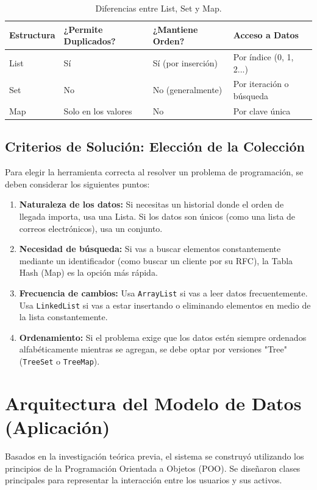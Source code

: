 \documentclass[12pt, letterpaper]{article}
\begin{document}
	\begin{table}[h]
		\centering
		\begin{tabular}{@{}llll@{}}
			\toprule
			\textbf{Estructura} & \textbf{¿Permite Duplicados?} & \textbf{¿Mantiene Orden?} & \textbf{Acceso a Datos} \\ \midrule
			List & Sí & Sí (por inserción) & Por índice (0, 1, 2...) \\
			Set & No & No (generalmente) & Por iteración o búsqueda \\
			Map & Solo en los valores & No & Por clave única \\ \bottomrule
		\end{tabular}
		\caption{Diferencias entre List, Set y Map.}
	\end{table}
	
	\subsection{Criterios de Solución: Elección de la Colección}
	Para elegir la herramienta correcta al resolver un problema de programación, se deben considerar los siguientes puntos:
	\begin{enumerate}
		\item \textbf{Naturaleza de los datos:} Si necesitas un historial donde el orden de llegada importa, usa una Lista. Si los datos son únicos (como una lista de correos electrónicos), usa un conjunto.
		\item \textbf{Necesidad de búsqueda:} Si vas a buscar elementos constantemente mediante un identificador (como buscar un cliente por su RFC), la Tabla Hash (Map) es la opción más rápida.
		\item \textbf{Frecuencia de cambios:} Usa \texttt{ArrayList} si vas a leer datos frecuentemente. Usa \texttt{LinkedList} si vas a estar insertando o eliminando elementos en medio de la lista constantemente.
		\item \textbf{Ordenamiento:} Si el problema exige que los datos estén siempre ordenados alfabéticamente mientras se agregan, se debe optar por versiones "Tree" (\texttt{TreeSet} o \texttt{TreeMap}).
	\end{enumerate}
	
	
	\section{Arquitectura del Modelo de Datos (Aplicación)}
	Basados en la investigación teórica previa, el sistema se construyó utilizando los principios de la Programación Orientada a Objetos (POO). Se diseñaron clases principales para representar la interacción entre los usuarios y sus activos.
	
\end{document}
